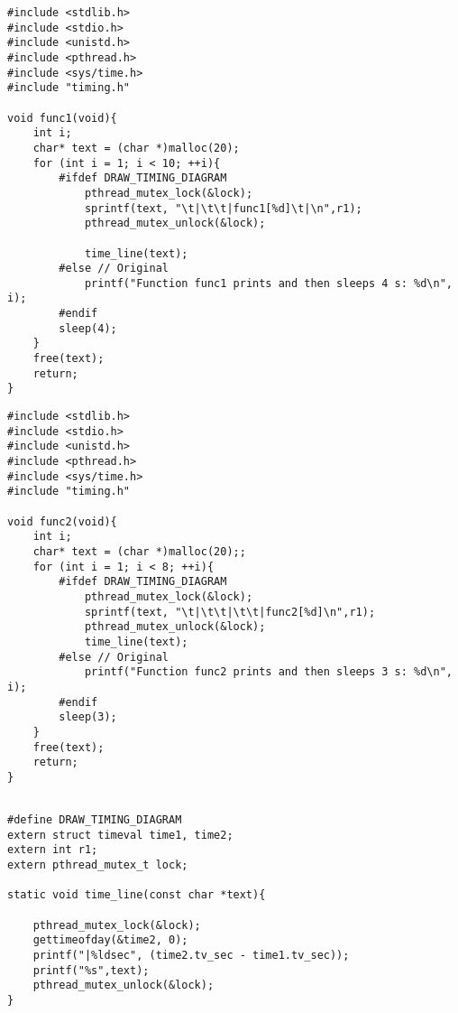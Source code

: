 \documentclass[11pt]{article}
\begin{document}
\thispagestyle{empty}
\begin{minipage}{1\textwidth}
\begin{lstlisting}[title=func1.c, frame=tlrb, basicstyle=\tiny]
#include <stdlib.h>
#include <stdio.h>
#include <unistd.h>
#include <pthread.h>
#include <sys/time.h>
#include "timing.h"

void func1(void){
	int i;
	char* text = (char *)malloc(20);
	for (int i = 1; i < 10; ++i){
		#ifdef DRAW_TIMING_DIAGRAM
			pthread_mutex_lock(&lock);
			sprintf(text, "\t|\t\t|func1[%d]\t|\n",r1);
			pthread_mutex_unlock(&lock);
			
			time_line(text);
		#else // Original
			printf("Function func1 prints and then sleeps 4 s: %d\n", i);
		#endif
		sleep(4);
	}
	free(text);
	return;
}
\end{lstlisting}
\end{minipage}

\thispagestyle{empty}
\begin{minipage}{1\textwidth}
\begin{lstlisting}[title=func2.c, frame=tlrb, basicstyle=\tiny]
#include <stdlib.h>
#include <stdio.h>
#include <unistd.h>
#include <pthread.h>
#include <sys/time.h>
#include "timing.h"

void func2(void){
	int i;
	char* text = (char *)malloc(20);;
	for (int i = 1; i < 8; ++i){
		#ifdef DRAW_TIMING_DIAGRAM
			pthread_mutex_lock(&lock);
			sprintf(text, "\t|\t\t|\t\t|func2[%d]\n",r1);
			pthread_mutex_unlock(&lock);
			time_line(text);
		#else // Original
			printf("Function func2 prints and then sleeps 3 s: %d\n", i);
		#endif
		sleep(3);
	}
	free(text);
	return;
}
\end{lstlisting}
\end{minipage}

\begin{minipage}{1\textwidth}
\begin{lstlisting}[title=timing.h, frame=tlrb, basicstyle=\tiny]

#define DRAW_TIMING_DIAGRAM
extern struct timeval time1, time2;
extern int r1;
extern pthread_mutex_t lock;

static void time_line(const char *text){

	pthread_mutex_lock(&lock);
	gettimeofday(&time2, 0);
	printf("|%ldsec", (time2.tv_sec - time1.tv_sec));
	printf("%s",text);
	pthread_mutex_unlock(&lock);
}


\end{lstlisting}
\end{minipage}
\end{document}
